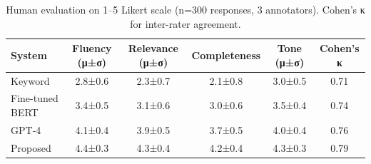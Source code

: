 \begin{table}
\caption{Human evaluation on 1–5 Likert scale (n=300 responses, 3 annotators). Cohen's κ for inter-rater agreement.}
\label{tab:tab07_human_evaluation}
\begin{tabular}{lccccc}
\toprule
System & Fluency (μ±σ) & Relevance (μ±σ) & Completeness & Tone (μ±σ) & Cohen's κ \\
\midrule
Keyword & 2.8±0.6 & 2.3±0.7 & 2.1±0.8 & 3.0±0.5 & 0.71 \\
Fine-tuned BERT & 3.4±0.5 & 3.1±0.6 & 3.0±0.6 & 3.5±0.4 & 0.74 \\
GPT-4 & 4.1±0.4 & 3.9±0.5 & 3.7±0.5 & 4.0±0.4 & 0.76 \\
Proposed & 4.4±0.3 & 4.3±0.4 & 4.2±0.4 & 4.3±0.3 & 0.79 \\
\bottomrule
\end{tabular}
\end{table}
